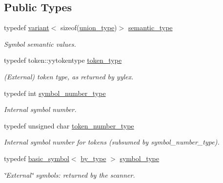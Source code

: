 \subsection*{Public Types}
\begin{DoxyCompactItemize}
\item 
\hypertarget{classyy_1_1parser_a0ce15da9cf616a7197b81e6055428165}{}typedef \hyperlink{structyy_1_1variant}{variant}$<$ sizeof(\hyperlink{unionyy_1_1parser_1_1union__type}{union\+\_\+type})$>$ \hyperlink{classyy_1_1parser_a0ce15da9cf616a7197b81e6055428165}{semantic\+\_\+type}\label{classyy_1_1parser_a0ce15da9cf616a7197b81e6055428165}

\begin{DoxyCompactList}\small\item\em Symbol semantic values. \end{DoxyCompactList}\item 
\hypertarget{classyy_1_1parser_ac1ba3f834abfa251ea746c4ca8da5a85}{}typedef token\+::yytokentype \hyperlink{classyy_1_1parser_ac1ba3f834abfa251ea746c4ca8da5a85}{token\+\_\+type}\label{classyy_1_1parser_ac1ba3f834abfa251ea746c4ca8da5a85}

\begin{DoxyCompactList}\small\item\em (External) token type, as returned by yylex. \end{DoxyCompactList}\item 
\hypertarget{classyy_1_1parser_a522f5c6c3481d9285b0b991ac12292eb}{}typedef int \hyperlink{classyy_1_1parser_a522f5c6c3481d9285b0b991ac12292eb}{symbol\+\_\+number\+\_\+type}\label{classyy_1_1parser_a522f5c6c3481d9285b0b991ac12292eb}

\begin{DoxyCompactList}\small\item\em Internal symbol number. \end{DoxyCompactList}\item 
\hypertarget{classyy_1_1parser_a9e3963a210d7f2b655d87ca544223ead}{}typedef unsigned char \hyperlink{classyy_1_1parser_a9e3963a210d7f2b655d87ca544223ead}{token\+\_\+number\+\_\+type}\label{classyy_1_1parser_a9e3963a210d7f2b655d87ca544223ead}

\begin{DoxyCompactList}\small\item\em Internal symbol number for tokens (subsumed by symbol\+\_\+number\+\_\+type). \end{DoxyCompactList}\item 
\hypertarget{classyy_1_1parser_aa8024edbba983aa5cd3e88c3a4dcacc9}{}typedef \hyperlink{structyy_1_1parser_1_1basic__symbol}{basic\+\_\+symbol}$<$ \hyperlink{structyy_1_1parser_1_1by__type}{by\+\_\+type} $>$ \hyperlink{classyy_1_1parser_aa8024edbba983aa5cd3e88c3a4dcacc9}{symbol\+\_\+type}\label{classyy_1_1parser_aa8024edbba983aa5cd3e88c3a4dcacc9}

\begin{DoxyCompactList}\small\item\em \char`\"{}\+External\char`\"{} symbols\+: returned by the scanner. \end{DoxyCompactList}\end{DoxyCompactItemize}

